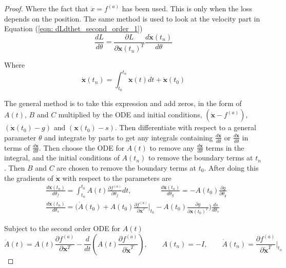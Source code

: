 \documentclass{article}
\theoremstyle{remark}
\theoremstyle{definition}
\begin{document}
\begin{proof}
Where the fact that $\ddot{x} = f^{(a)}$ has been used. This is only when the loss depends on the position. The same method is used to look at the velocity part in Equation (\ref{eqn: dLdthet_second_order_1})
\begin{equation}
\frac{dL}{d\theta} = \frac{\partial L}{\partial \dot{\mathbf{x}}(t_{n})^{T}}
\frac{d\dot{\mathbf{x}}(t_{n})}{d\theta}
\end{equation}

Where
\begin{equation}
\dot{\mathbf{x}}(t_{n}) = \int_{t_{0}}^{t_{n}}\ddot{\mathbf{x}}(t)dt + \dot{\mathbf{x}}(t_{0})
\end{equation}

The general method is to take this expression and add zeros, in the form of $A(t)$, $B$ and $C$ multiplied by the ODE and initial conditions, $(\ddot{\mathbf{x}}-f^{(a)})$, $(\dot{\mathbf{x}}(t_{0})-g)$ and $(\mathbf{x}(t_{0})-s)$. Then differentiate with respect to a general parameter $\theta$ and integrate by parts to get any integrals containing $\displaystyle  \frac{d\dot{\mathbf{x}}}{d\theta}$ or $\displaystyle  \frac{d\ddot{\mathbf{x}}}{d\theta}$ in terms of $\displaystyle  \frac{d\mathbf{x}}{d\theta}$. Then choose the ODE for $A(t)$ to remove any $\displaystyle  \frac{d\mathbf{x}}{d\theta}$ terms in the integral, and the initial conditions of $A(t_{n})$ to remove the boundary terms at $t_{n}$. Then $B$ and $C$ are chosen to remove the boundary terms at $t_{0}$. After doing this the gradients of $\dot{\mathbf{x}}$ with respect to the parameters are
\begin{equation}
\begin{aligned}
&\frac{d\dot{\mathbf{x}}(t_{n})}{d\theta_{f}}  = \int_{t_{n}}^{t_{0}}A(t)\frac{\partial f^{(a)}}{\partial \theta_{f}}dt
,\qquad\qquad
\frac{d\dot{\mathbf{x}}(t_{n})}{d\theta_{g}}  = -A(t_{0})
\frac{\partial g}{\partial \theta_{g}}
\\
&\frac{d\dot{\mathbf{x}}(t_{n})}{d\theta_{s}}  = \Biggr(
\dot{A}(t_{0}) + A(t_{0})
\frac{\partial f^{(a)}}{\partial \dot{\mathbf{x}}^{T}}\Biggr\vert_{t_{0}} 
- A(t_{0})\frac{\partial g}{\partial \mathbf{x}(t_{0})^{T}}
\Biggr)\frac{ds}{d\theta_{s}}
\end{aligned}
\end{equation}

Subject to the second order ODE for $A(t)$
\begin{equation}
\ddot{A}(t) = A(t)\frac{\partial f^{(a)}}{\partial \mathbf{x}^{T}} - \frac{d}{dt}\left(
    A(t)\frac{\partial f^{(a)}}{\partial \dot{\mathbf{x}}^{T}}
    \right) 
,\qquad
A(t_{n}) = -I
,\qquad
\dot{A}(t_{n}) = \frac{\partial f^{(a)}}{\partial \dot{\mathbf{x}}^{T}}\Biggr\vert_{t_{n}}
\end{equation}


\end{proof}
\end{document}
